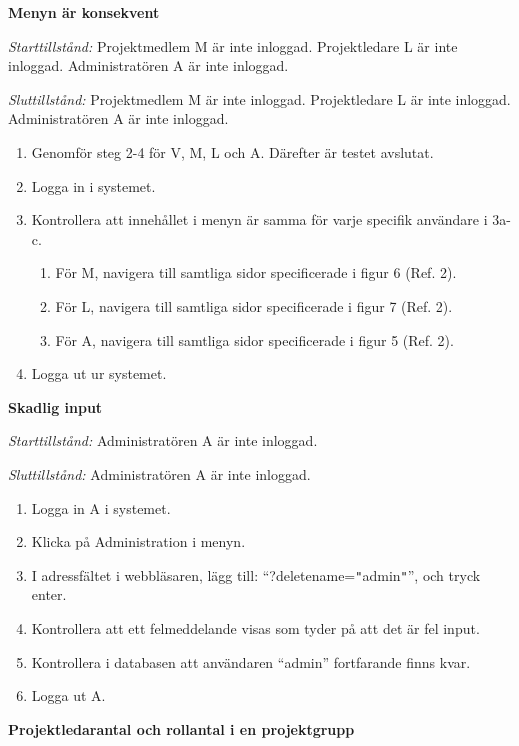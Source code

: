 \documentclass[a4paper]{article}
\begin{document}
\begin{FT}
\item \textbf{Menyn är konsekvent}

\emph{Starttillstånd:} Projektmedlem M är inte inloggad. Projektledare L är inte inloggad. Administratören A är inte inloggad.

\emph{Sluttillstånd:} Projektmedlem M är inte inloggad. Projektledare L är inte inloggad. Administratören A är inte inloggad.

\begin{enumerate}
\item Genomför steg 2-4 för V, M, L och A. Därefter är testet avslutat.
\item Logga in i systemet.
\item Kontrollera att innehållet i menyn är samma för varje specifik användare i 3a-c.
\begin{enumerate}
\item För M, navigera till samtliga sidor specificerade i figur 6 (Ref. 2).
\item För L, navigera till samtliga sidor specificerade i figur 7 (Ref. 2).
\item För A, navigera till samtliga sidor specificerade i figur 5 (Ref. 2).
\end{enumerate}
\item Logga ut ur systemet.
\end{enumerate}

\item \textbf{Skadlig input}

\emph{Starttillstånd:} Administratören A är inte inloggad.

\emph{Sluttillstånd:} Administratören A är inte inloggad.

\begin{enumerate}
\item Logga in A i systemet.
\item Klicka på Administration i menyn.
\item I adressfältet i webbläsaren, lägg till: ``?deletename=\texttt{"}admin\texttt{"}'', och tryck enter.
\item Kontrollera att ett felmeddelande visas som tyder på att det är fel input.
\item Kontrollera i databasen att användaren ``admin'' fortfarande finns kvar.
\item Logga ut A.
\end{enumerate}

\item \textbf{Projektledarantal och rollantal i en projektgrupp}


\end{FT}
\end{document}
